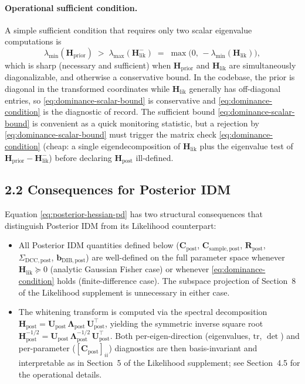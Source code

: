 \documentclass[11pt]{article}
\begin{document}
\paragraph{Operational sufficient condition.}
A simple sufficient condition that requires only two scalar eigenvalue computations is
\begin{equation}
\lambda_{\min}(\mathbf H_{\mathrm{prior}}) \;>\; \lambda_{\max}(\mathbf H_{\mathrm{lik}}^-)
\;=\;
\max\bigl(0,\, -\lambda_{\min}(\mathbf H_{\mathrm{lik}})\bigr),
\label{eq:dominance-scalar-bound}
\end{equation}
which is sharp (necessary and sufficient) when $\mathbf H_{\mathrm{prior}}$ and $\mathbf H_{\mathrm{lik}}$ are simultaneously diagonalizable, and otherwise a conservative bound. In the codebase, the prior is diagonal in the transformed coordinates while $\mathbf H_{\mathrm{lik}}$ generally has off-diagonal entries, so \eqref{eq:dominance-scalar-bound} is conservative and \eqref{eq:dominance-condition} is the diagnostic of record. The sufficient bound \eqref{eq:dominance-scalar-bound} is convenient as a quick monitoring statistic, but a rejection by \eqref{eq:dominance-scalar-bound} must trigger the matrix check \eqref{eq:dominance-condition} (cheap: a single eigendecomposition of $\mathbf H_{\mathrm{lik}}$ plus the eigenvalue test of $\mathbf H_{\mathrm{prior}} - \mathbf H_{\mathrm{lik}}^-$) before declaring $\mathbf H_{\mathrm{post}}$ ill-defined.

\subsection*{2.2 Consequences for Posterior IDM}

Equation \eqref{eq:posterior-hessian-pd} has two structural consequences that distinguish Posterior IDM from its Likelihood counterpart:
\begin{itemize}
\item All Posterior IDM quantities defined below ($\mathbf C_{\mathrm{post}}$, $\mathbf C_{\mathrm{sample},\mathrm{post}}$, $\mathbf R_{\mathrm{post}}$, $\Sigma_{\mathrm{DCC},\mathrm{post}}$, $\mathbf b_{\mathrm{DIB},\mathrm{post}}$) are well-defined on the full parameter space whenever $\mathbf H_{\mathrm{lik}} \succeq 0$ (analytic Gaussian Fisher case) or whenever \eqref{eq:dominance-condition} holds (finite-difference case). The subspace projection of Section~8 of the Likelihood supplement is unnecessary in either case.
\item The whitening transform is computed via the spectral decomposition $\mathbf H_{\mathrm{post}} = \mathbf U_{\mathrm{post}}\, \boldsymbol\Lambda_{\mathrm{post}}\, \mathbf U_{\mathrm{post}}^\top$, yielding the symmetric inverse square root $\mathbf H_{\mathrm{post}}^{-1/2} = \mathbf U_{\mathrm{post}}\, \boldsymbol\Lambda_{\mathrm{post}}^{-1/2}\, \mathbf U_{\mathrm{post}}^\top$. Both per-eigen-direction (eigenvalues, $\mathrm{tr}$, $\det$) and per-parameter ($[\mathbf C_{\mathrm{post}}]_{ii}$) diagnostics are then basis-invariant and interpretable as in Section~5 of the Likelihood supplement; see Section~4.5 for the operational details.
\end{itemize}
\end{document}

